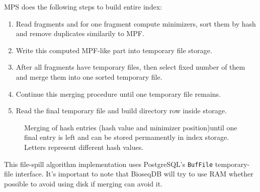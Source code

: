 \begin{minipage}{\linewidth}
MPS does the following steps to build entire index:
\begin{enumerate}
  \item Read fragments and for one fragment compute minimizers, sort them by hash and remove duplicates similarily to MPF.
  \item Write this computed MPF-like part into temporary file storage.
  \item After all fragments have temporary files, then select fixed number of them and merge them into one sorted temporary file.
  \item Continue this merging procedure until one temporary file remains.
  \item Read the final temporary file and build directory row inside storage.
\end{enumerate}
\end{minipage}

\begin{figure}[htbp]
\centering
{}
\caption{Merging of hash entries (hash value and minimizer position)until one final entry is left and can be stored permamently in index storage. Letters represent different hash values.}
\label{fig:index-mps-merge}
\end{figure}

This file-spill algorithm implementation uses PostgreSQL's \texttt{BufFile} temporary-file
interface. It's important to note that BioseqDB will try to use RAM whether possible to avoid using disk if merging can avoid it.